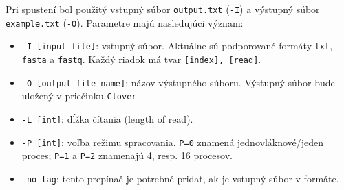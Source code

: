 Pri spustení bol použitý vstupný súbor \texttt{output.txt} (\texttt{-I})
a výstupný súbor \texttt{example.txt} (\texttt{-O}). Parametre majú nasledujúci význam:
\begin{itemize}
    \item \texttt{-I [input\_file]}: vstupný súbor. Aktuálne sú podporované formáty \texttt{txt}, \texttt{fasta} a \texttt{fastq}. Každý riadok má tvar \texttt{[index], [read]}.
    \item \texttt{-O [output\_file\_name]}: názov výstupného súboru. Výstupný súbor bude uložený v priečinku \texttt{Clover}.
    \item \texttt{-L [int]}: dĺžka čítania (length of read).
    \item \texttt{-P [int]}: voľba režimu spracovania. \texttt{P=0} znamená jednovláknové/jeden proces; \texttt{P=1} a \texttt{P=2} znamenajú 4, resp. 16 procesov.
    \item \texttt{--no-tag}: tento prepínač je potrebné pridať, ak je vstupný súbor v  formáte.
\end{itemize}
